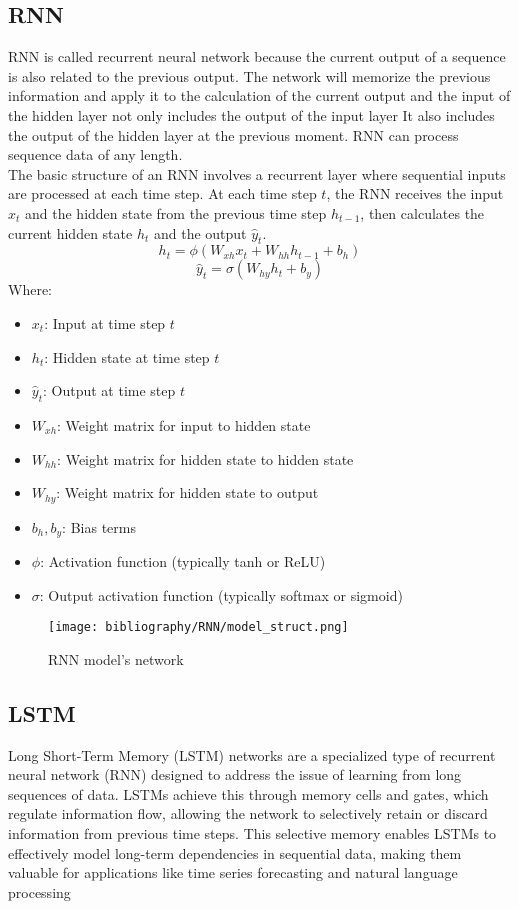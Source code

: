\documentclass{ieeeojies}
\begin{document}
\subsection{RNN} 
RNN is called recurrent neural network because the current output of a sequence is also related to the previous output. The network will memorize  the  previous  information and apply  it  to  the calculation of  the  current  output and the input of the hidden layer not only  includes the output of  the input layer It also  includes  the output of the  hidden layer at the previous moment. RNN can process sequence data of any length. \\
The basic structure of an RNN involves a recurrent layer where sequential inputs are processed at each time step. At each time step \(t\), the RNN receives the input \(x_t\) and the hidden state from the previous time step \(h_{t-1}\), then calculates the current hidden state \(h_t\) and the output \(\hat{y}_t\). \cite{b10}
\[
h_t = \phi(W_{xh} x_t + W_{hh} h_{t-1} + b_h)
\]
\[
\hat{y}_t = \sigma(W_{hy} h_t + b_y)
\]
Where:
\begin{itemize}
    \item \(x_t\): Input at time step \(t\)
    \item \(h_t\): Hidden state at time step \(t\)
    \item \(\hat{y}_t\): Output at time step \(t\)
    \item \(W_{xh}\): Weight matrix for input to hidden state
    \item \(W_{hh}\): Weight matrix for hidden state to hidden state
    \item \(W_{hy}\): Weight matrix for hidden state to output
    \item \(b_h, b_y\): Bias terms
    \item \(\phi\): Activation function (typically tanh or ReLU)
    \item \(\sigma\): Output activation function (typically softmax or sigmoid)
\end{itemize}
\begin{figure}[H]
    \centering
    \begin{minipage}{0.45\textwidth}
    \centering
    \texttt{[image: bibliography/RNN/model\_struct.png]}    
    \label{fig:1}
    \caption{RNN model's network \cite{b11}}
    \end{minipage}
\end{figure}
\subsection{LSTM} 
Long Short-Term Memory (LSTM) networks are a specialized type of recurrent neural network (RNN) designed to address the issue of learning from long sequences of data. LSTMs achieve this through memory cells and gates, which regulate information flow, allowing the network to selectively retain or discard information from previous time steps. This selective memory enables LSTMs to effectively model long-term dependencies in sequential data, making them valuable for applications like time series forecasting and natural language processing \cite{b12}
\end{document}
